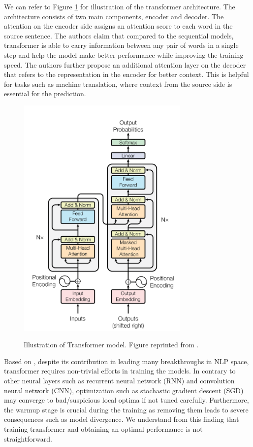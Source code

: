 We can refer to Figure \ref{img:transformer} for illustration of the transformer architecture. The architecture consists of two main components, encoder and decoder. The attention on the encoder side assigns an attention score to each word in the source sentence. The authors claim that compared to the sequential models, transformer is able to carry information between any pair of words in a single step and help the model make better performance while improving the training speed. The authors further propose an additional attention layer on the decoder that refers to the representation in the encoder for better context. This is helpful for tasks such as machine translation, where context from the source side is essential for the prediction.

\begin{figure}[h]
    {\includegraphics[width=0.75\textwidth]{img/transformer.png}}
    \centering
    \caption{Illustration of Transformer model. Figure reprinted from \cite{vaswani2017attention}.}
    \label{img:transformer}
\end{figure}

Based on \cite{liu2020understanding}, despite its contribution in leading many breakthroughs in NLP space, transformer requires non-trivial efforts in training the models. In contrary to other neural layers such as recurrent neural network (RNN) and convolution neural network (CNN), optimization such as stochastic gradient descent (SGD) may converge to bad/suspicious local optima if not tuned carefully. Furthermore, the warmup stage is crucial during the training as removing them leads to severe consequences such as model divergence. We understand from this finding that training transformer and obtaining an optimal performance is not straightforward.

